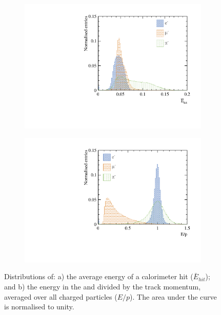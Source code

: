 \begin{figure}[htbp]
\centering
\begin{subfigure}[b]{0.45\textwidth}
 \includegraphics[width=\textwidth]{tau/var3/eCellMean_100GeV_improved}
  \caption{}
  \label{fig:tauVarECellMean}
\end{subfigure}
\begin{subfigure}[b]{0.45\textwidth}
 \includegraphics[width=\textwidth]{tau/var3/eOverPCharge_100GeV_improved}
  \caption{}
  \label{fig:tauVarEOverPCharge}
\end{subfigure}
\caption
{Distributions of: a) the average energy of a calorimeter hit ($\bar{E}_{hit}$); and b)  the energy in the \ECAL and \HCAL divided by the track momentum, averaged over all charged particles ($E/p$).  The area under the curve is normalised to unity.}
\label{fig:tauVar5}
\end{figure}


